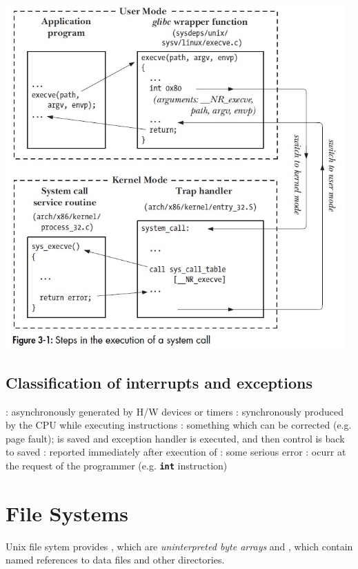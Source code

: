 \documentclass{note}
\begin{document}
{\centerline{\includegraphics[width=13cm]{pics/syscall}}


\subsection{Classification of interrupts and exceptions}
\bit
\w {}: asynchronously generated by H/W devices or timers
  \bit
  \w {}
  \w {}
  \eit
\w {}: synchronously produced by the CPU while executing
   instructions 
  \bit
  \w {}: something which can be corrected (e.g. page fault); 
  is saved and exception handler is executed, and then control is back to
  saved 
  \w {}: reported immediately after execution of  
  \w {}: some serious error
  \eit
\w {}: ocurr at the
request of the programmer (e.g. \texttt{\textbf{int}} instruction)
\eit



\pagebreak
\section{File Systems}
Unix file sytem provides , which are {\em uninterpreted byte
arrays\/} and , which contain named references to data files
and other directories.

}
\end{document}
